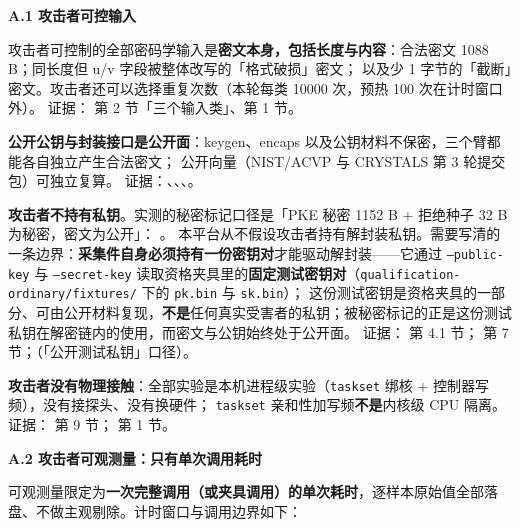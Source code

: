 \noindent\textbf{A.1 攻击者可控输入}\par
攻击者可控制的全部密码学输入是\textbf{密文本身，包括长度与内容}：合法密文 1088 B；同长度但 u/v 字段被整体改写的「格式破损」密文；
以及少 1 字节的「截断」密文。攻击者还可以选择重复次数（本轮每类 10000 次，预热 100 次在计时窗口外）。
证据： 第 2 节「三个输入类」、第 1 节。\par
\textbf{公开公钥与封装接口是公开面}：keygen、encaps 以及公钥材料不保密，三个臂都能各自独立产生合法密文；
公开向量（NIST/ACVP 与 CRYSTALS 第 3 轮提交包）可独立复算。
证据：、、、。\par
\textbf{攻击者不持有私钥}。实测的秘密标记口径是「PKE 秘密 1152 B + 拒绝种子 32 B 为秘密，密文为公开」：
\texttt{}。
本平台从不假设攻击者持有解封装私钥。需要写清的一条边界：\textbf{采集件自身必须持有一份密钥对}才能驱动解封装——它通过
\texttt{--public-key} 与 \texttt{--secret-key} 读取资格夹具里的\textbf{固定测试密钥对}（\texttt{qualification-ordinary/fixtures/} 下的 \texttt{pk.bin} 与 \texttt{sk.bin}）；
这份测试密钥是资格夹具的一部分、可由公开材料复现，\textbf{不是}任何真实受害者的私钥；被秘密标记的正是这份测试私钥在解密链内的使用，而密文与公钥始终处于公开面。
证据： 第 4.1 节； 第 7 节；（「公开测试私钥」口径）。\par
\textbf{攻击者没有物理接触}：全部实验是本机进程级实验（\texttt{taskset} 绑核 + 控制器写频），没有接探头、没有换硬件；
\texttt{taskset} 亲和性加写频\textbf{不是}内核级 CPU 隔离。
证据： 第 9 节；\texttt{} 第 1 节。

\noindent\textbf{A.2 攻击者可观测量：只有单次调用耗时}\par
可观测量限定为\textbf{一次完整调用（或夹具调用）的单次耗时}，逐样本原始值全部落盘、不做主观剔除。计时窗口与调用边界如下：

